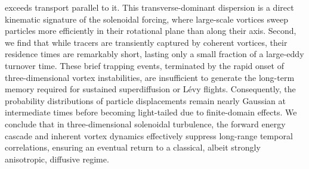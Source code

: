 \documentclass[]{article}
\begin{document}
exceeds transport parallel to it. This transverse-dominant dispersion is a direct kinematic signature of the solenoidal forcing, where large-scale vortices sweep particles more efficiently in their rotational plane than along their axis. Second, we find that while tracers are transiently captured by coherent vortices, their residence times are remarkably short, lasting only a small fraction of a large-eddy turnover time. These brief trapping events, terminated by the rapid onset of three-dimensional vortex instabilities, are insufficient to generate the long-term memory required for sustained superdiffusion or Lévy flights. Consequently, the probability distributions of particle displacements remain nearly Gaussian at intermediate times before becoming light-tailed due to finite-domain effects. We conclude that in three-dimensional solenoidal turbulence, the forward energy cascade and inherent vortex dynamics effectively suppress long-range temporal correlations, ensuring an eventual return to a classical, albeit strongly anisotropic, diffusive regime.
\end{document}
